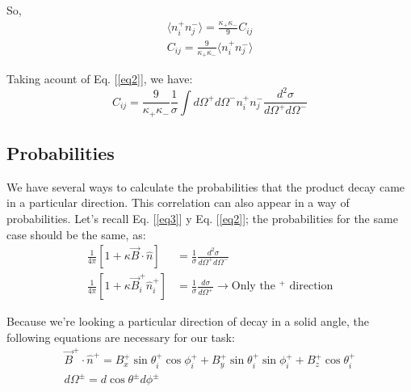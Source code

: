 \documentclass[onecolumn, amsmath, amssymb, aps, prd]{revtex4-2}
\begin{document}
			So,
			\begin{align}
				\langle n_i^+ n_j^- \rangle = \frac{\kappa_+ \kappa_-}{9} C_{ij} \\
				C_{ij} = \frac{9}{\kappa_+ \kappa_-} \langle n_i^+ n_j^- \rangle
			\end{align}

			Taking acount of Eq. [\ref{eq2}], we have:
			\begin{equation}
				C_{ij} = \frac{9}{\kappa_+ \kappa_-} \frac{1}{\sigma} \int d\Omega^+ d\Omega^- n_i^+ n_j^-\frac{d^2\sigma}{d\Omega^+ d\Omega^-}
			\end{equation}

		\subsection{Probabilities}
			We have several ways to calculate the probabilities that the product decay came in a particular direction. This correlation can also appear in a way of probabilities. Let's recall Eq. [\ref{eq3}] y Eq. [\ref{eq2}]; the probabilities for the same case should be the same, as:
			\begin{equation} \label{eq4}
				\begin{split}
					\frac{1}{4\pi} \left[ 1 + \kappa \vec{B} \cdot \hat{n} \right] & = \frac{1}{\sigma} \frac{d^2\sigma}{d\Omega^+ d\Omega^-} \\
					\frac{1}{4\pi} \left[ 1 + \kappa \vec{B}_i^+ \hat{n}_i^+ \right] & = \frac{1}{\sigma} \frac{d\sigma}{d\Omega^+} \longrightarrow \text{Only the $^+$ direction}
				\end{split}
			\end{equation}

			Because we're looking a particular direction of decay in a solid angle, the following equations are necessary for our task:
			\begin{align}
				\vec{B}^+ \cdot \hat{n}^+ = B_x^+ \sin \theta_i^+ \cos \phi_i^+ + B_y^+ \sin \theta_i^+ \sin \phi_i^+ + B_z^+ \cos \theta_i^+ \\
				d\Omega^{\pm} = d \cos \theta^{\pm} d\phi^{\pm}
			\end{align}
\end{document}
